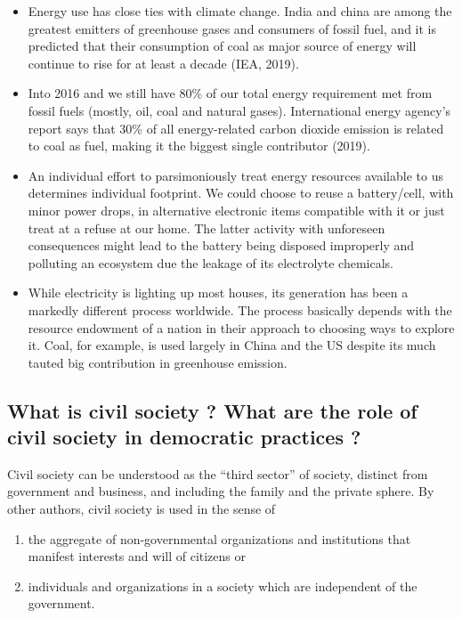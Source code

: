 \documentclass[
]{book}
\providecommand{\tightlist}{%
  \setlength{\itemsep}{0pt}\setlength{\parskip}{0pt}}
\begin{document}
\begin{itemize}
\tightlist
\item
  Energy use has close ties with climate change. India and china are among the greatest emitters of greenhouse gases and consumers of fossil fuel, and it is predicted that their consumption of coal as major source of energy will continue to rise for at least a decade (IEA, 2019).
\item
  Into 2016 and we still have 80\% of our total energy requirement met from fossil fuels (mostly, oil, coal and natural gases). International energy agency's report says that 30\% of all energy-related carbon dioxide emission is related to coal as fuel, making it the biggest single contributor (2019).
\item
  An individual effort to parsimoniously treat energy resources available to us determines individual footprint. We could choose to reuse a battery/cell, with minor power drops, in alternative electronic items compatible with it or just treat at a refuse at our home. The latter activity with unforeseen consequences might lead to the battery being disposed improperly and polluting an ecosystem due the leakage of its electrolyte chemicals.
\item
  While electricity is lighting up most houses, its generation has been a markedly different process worldwide. The process basically depends with the resource endowment of a nation in their approach to choosing ways to explore it. Coal, for example, is used largely in China and the US despite its much tauted big contribution in greenhouse emission.
\end{itemize}

\hypertarget{what-is-civil-society-what-are-the-role-of-civil-society-in-democratic-practices}{%
\subsection{What is civil society ? What are the role of civil society in democratic practices ?}\label{what-is-civil-society-what-are-the-role-of-civil-society-in-democratic-practices}}

Civil society can be understood as the ``third sector'' of society, distinct from government and business, and including the family and the private sphere. By other authors, civil society is used in the sense of

\begin{enumerate}
\def\labelenumi{\arabic{enumi})}
\tightlist
\item
  the aggregate of non-governmental organizations and institutions that manifest interests and will of citizens or
\item
  individuals and organizations in a society which are independent of the government.
\end{enumerate}
\end{document}
